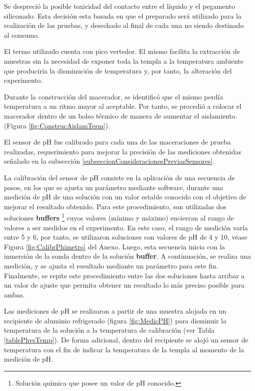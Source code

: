         \par Se despreció la posible toxicidad del contacto entre el líquido y el pegamento siliconado. Esta decisión esta basada en que el preparado será utilizado para la realización de las pruebas, y desechado al final de cada una no siendo destinado  al consumo.
        
        \par El termo utilizado cuenta con pico vertedor. El mismo facilita la extracción de muestras sin la necesidad de exponer toda la templa a la temperatura ambiente que produciría la disminución de temperatura y, por tanto, la alteración del experimento.
        
        \par Durante la construcción del macerador, se identificó que el mismo perdía temperatura a un ritmo mayor al aceptable. Por tanto, se procedió a colocar el macerador dentro de un bolso térmico de manera de aumentar el aislamiento. (Figura \ref{fig:ConstrucAislamTerm}).
        
        \par El sensor de pH fue calibrado para cada una de las maceraciones de prueba realizadas, requerimiento para mejorar la precisión de las mediciones obtenidas señalado en la subsección \ref{subseccionConsideracionesPreviasSensores}.
        
        \par La calibración del sensor de pH consiste en la aplicación de una secuencia de pasos, en los que se ajusta un parámetro mediante software, durante una medición de pH de una solución con un valor estable conocido con el objetivo de mejorar el resultado obtenido. Para este procedimiento, son utilizadas dos soluciones \textbf{buffers} \footnote{Solución química que posee un valor de pH conocido.} cuyos valores (mínimo y máximo) encierran al rango de valores a ser medidos en el experimento. En este caso, el rango de medición varía entre 5 y 6, por tanto, se utilizaron soluciones con valores de pH de 4 y 10, véase Figura \ref{fig:CalibrPhimetro} del Anexo. Luego, esta secuencia inicia con la inmersión de la sonda dentro de la solución \textbf{buffer}. A continuación, se realiza una medición, y se ajusta el resultado mediante un parámetro para este fin. Finalmente, se repite este procedimiento entre las dos soluciones hasta arribar a un valor de ajuste que permita obtener un resultado lo más preciso posible para ambas.
        
        \par Las mediciones de pH se realizaron a partir de una muestra alojada en un recipiente de aluminio refrigerado (figura \ref{fig:MedicPH}) para disminuir la temperatura de la solución a la temperatura de calibración (ver Tabla \ref{tablePhvsTemp}). De forma adicional, dentro del recipiente se alojó un sensor de temperatura con el fin de indicar la temperatura de la templa al momento de la medición de pH.
        

